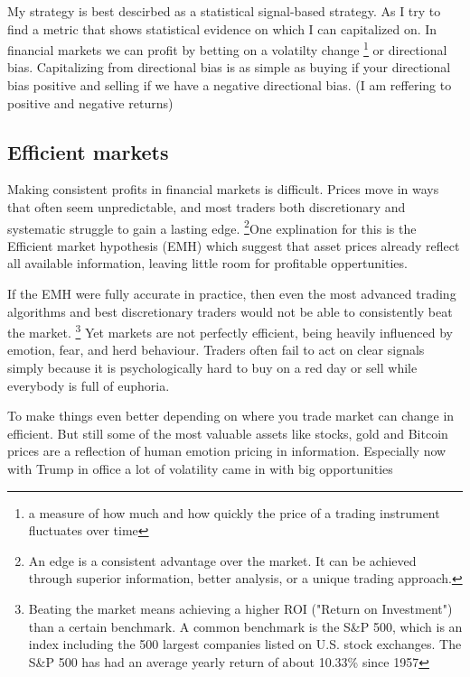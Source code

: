 \documentclass[12pt]{article}
\begin{document}
My strategy is best descirbed as a statistical signal-based strategy. As I try to find a metric that shows statistical evidence on which I can capitalized on. In financial markets we can profit by betting on a volatilty change \footnote{a measure of how much and how quickly the price of a trading instrument fluctuates over time} or directional bias. Capitalizing from directional bias is as simple as buying if your directional bias positive and selling if we have a negative directional bias. (I am reffering to positive and negative returns)















\newpage
\subsection*{Efficient markets}
Making consistent profits in financial markets is difficult. Prices move in ways that often seem unpredictable, and most traders both discretionary and systematic struggle to gain a lasting edge. \footnote[1]{An edge is a consistent advantage over the market. It can be achieved through superior information, better analysis, or a unique trading approach.}One explination for this is the Efficient market hypothesis (EMH) which suggest that asset prices already reflect all available information, leaving little room for profitable oppertunities.






If the EMH were fully accurate in practice, then even the most advanced trading algorithms and best discretionary traders would not be able to consistently beat the market. \footnote[2]{Beating the market means achieving a higher ROI ("Return on Investment") than a certain benchmark. A common benchmark is the S\&P 500, which is an index including the 500 largest companies listed on U.S. stock exchanges. The S\&P 500 has had an average yearly return of about 10.33\% since 1957} Yet markets are not perfectly efficient, being heavily influenced by emotion, fear, and herd behaviour. Traders often fail to act on clear signals simply because it is psychologically hard to buy on a red day or sell while everybody is full of euphoria.


To make things even better depending on where you trade market can change in efficient. But still some of the most valuable assets like stocks, gold and Bitcoin prices are a reflection of human emotion pricing in information. Especially now with Trump in office a lot of volatility came in with big opportunities
\end{document}
